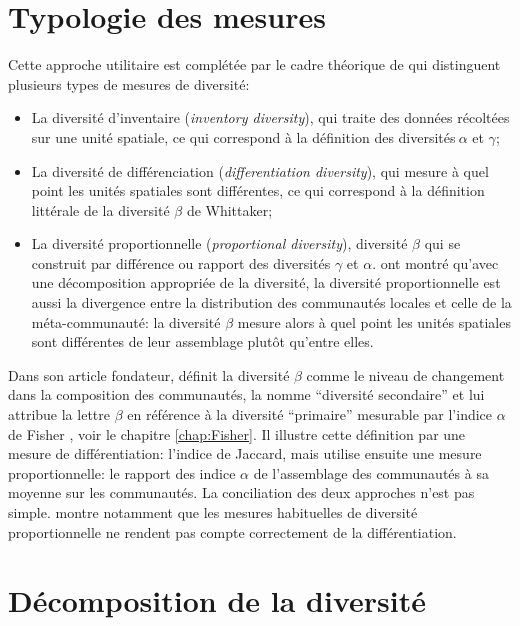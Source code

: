 \documentclass[
  11pt,
  french,
  a4paper,
  extrafontsizes,onecolumn,openright
  ]{memoir}
\providecommand{\tightlist}{%
  \setlength{\itemsep}{0pt}\setlength{\parskip}{0pt}}
\begin{document}
\hypertarget{sec:betaTypo}{%
\section{Typologie des mesures}\label{sec:betaTypo}}

Cette approche utilitaire est complétée par le cadre théorique de \textcite{Jurasinski2009} qui distinguent plusieurs types de mesures de diversité:

\begin{itemize}
\tightlist
\item
  La diversité d'inventaire (\emph{inventory diversity}), qui traite des données récoltées sur une unité spatiale, ce qui correspond à la définition des diversités\(\ \alpha\) et \(\gamma\);
\item
  La diversité de différenciation (\emph{differentiation diversity}), qui mesure à quel point les unités spatiales sont différentes, ce qui correspond à la définition littérale de la diversité \(\beta\) de Whittaker;
\item
  La diversité proportionnelle (\emph{proportional diversity}), diversité \(\beta\) qui se construit par différence ou rapport des diversités \(\gamma\) et \(\alpha\). \textcite{Marcon2014a} ont montré qu'avec une décomposition appropriée de la diversité, la diversité proportionnelle est aussi la divergence entre la distribution des communautés locales et celle de la méta-communauté: la diversité \(\beta\) mesure alors à quel point les unités spatiales sont différentes de leur assemblage plutôt qu'entre elles.
\end{itemize}

Dans son article fondateur, \textcite{Whittaker1960} définit la diversité \(\beta\) comme le niveau de changement dans la composition des communautés, la nomme ``diversité secondaire'' et lui attribue la lettre \(\beta\) en référence à la diversité ``primaire'' mesurable par l'indice \(\alpha\) de Fisher \autocite{Fisher1943}, voir le chapitre \ref{chap:Fisher}.
Il illustre cette définition par une mesure de différentiation: l'indice de Jaccard, mais utilise ensuite une mesure proportionnelle: le rapport des indice \(\alpha\) de l'assemblage des communautés à sa moyenne sur les communautés.
La conciliation des deux approches n'est pas simple.
\textcite{Gregorius2016} montre notamment que les mesures habituelles de diversité proportionnelle ne rendent pas compte correctement de la différentiation.

\hypertarget{sec:betaDecomposition}{%
\section{Décomposition de la diversité}\label{sec:betaDecomposition}}
\end{document}
